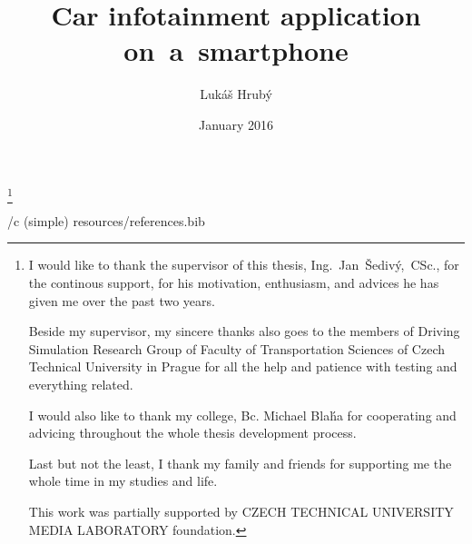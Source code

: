 

\worktype [M/EN]
\title {Car infotainment application on~a~smartphone}
\author {Lukáš Hrubý}
\date {January 2016}
\thanks{
I would like to thank the supervisor of this thesis, Ing.~Jan~\v Sediv\' y,~CSc., for the continous support, for his motivation, enthusiasm, and advices he has given me over the past two years. 

Beside my supervisor, my sincere thanks also goes to the members of Driving Simulation Research Group of Faculty of Transportation Sciences of Czech Technical University in Prague for all the help and patience with testing and everything related. 

I would also like to thank my college, Bc. Michael Bla\' ha for cooperating and advicing throughout the whole thesis development process. 

Last but not the least, I thank my family and friends for supporting me the whole time in my studies and life.

\hfil\break

This work was partially supported by CZECH TECHNICAL UNIVERSITY MEDIA LABORATORY foundation.}

\draft


\makefront


\nextoddpage


\nextoddpage


\nextoddpage


\nextoddpage


\nextoddpage


\nextoddpage

\bibchap
\usebib/c (simple) resources/references.bib

\bye